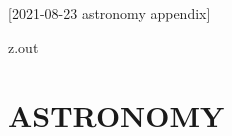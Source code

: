[2021-08-23 astronomy appendix]

\begin{VerbatimOut}{z.out}
\chapter{ASTRONOMY}


\end{VerbatimOut}

\MyIO
